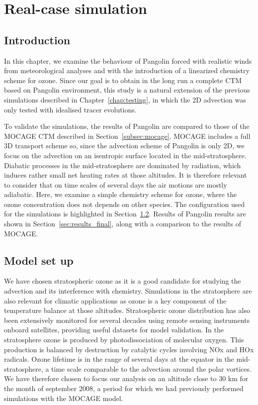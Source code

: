 \chapter{Real-case simulation}
\label{chap:real_case}

\section{Introduction}
In this chapter, we examine the behaviour of Pangolin forced with realistic
winds from meteorological analyses and with the introduction of a linearized
chemistry scheme for ozone. Since our goal is to obtain in the long run a complete
CTM based on Pangolin environment, this study is a natural extension of the
previous simulations described in Chapter~\ref{chap:testing}, in which  the  2D
advection was only tested with idealised tracer evolutions. 

To validate the simulations, the results of Pangolin are compared to those of the
MOCAGE CTM described in Section~\ref{subsec:mocage}. MOCAGE includes a full 3D
transport scheme so, since the advection scheme of Pangolin is only 2D, we
focus on the advection on an isentropic surface located in the mid-stratosphere.
Diabatic processes in the mid-stratosphere are dominated by radiation, which
induces rather small net heating rates at those altitudes. It is therefore relevant
to consider that on time scales of several days the air motions are mostly
adiabatic.
Here, we examine a simple chemistry scheme for ozone, where the ozone
concentration does not depends on other species. The configuration used for the
simulations is highlighted in Section~\ref{sec:config}. Results of Pangolin results are
shown in Section~\ref{sec:results_final}, along with a comparison to the results
of MOCAGE\@.

\section{Model set up}
\label{sec:config}
We have chosen stratospheric ozone as it is a good candidate for
studying the advection and its interference with chemistry. Simulations in the
stratosphere are also relevant for climatic applications as ozone is a key
component of the temperature balance at those altitudes. Stratospheric ozone
distribution has also been extensively monitored for several decades using remote
sensing instruments onboard satellites, providing useful datasets for model
validation.  In the stratosphere ozone is produced by photodissociation of
molecular oxygen. This production is balanced by destruction by catalytic cycles
involving NOx and HOx radicals.  Ozone lifetime is in the range of several days
at the equator in the mid-stratosphere, a time scale comparable to the advection
around the polar vortices. We have therefore chosen to focus our analysis on an
altitude close to 30 km for the month of september 2008, a period for which we
had previously performed simulations with the MOCAGE model.
 
